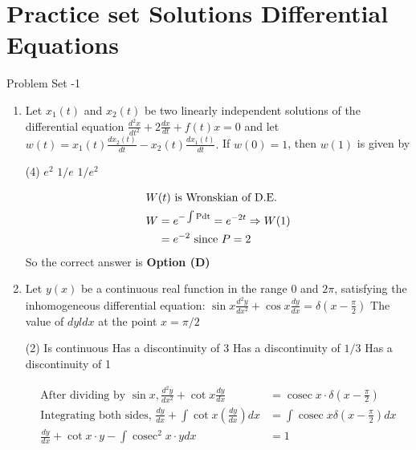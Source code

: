 \chapter{Practice set Solutions Differential Equations}
\begin{abox}
	Problem Set -1
\end{abox}
\begin{enumerate}[label=\color{ocre}\textbf{\arabic*.}]	
	\item Let $x_{1}(t)$ and $x_{2}(t)$ be two linearly independent solutions of the differential equation $\frac{d^{2} x}{d t^{2}}+2 \frac{d x}{d t}+f(t) x=0$ and let $w(t)=x_{1}(t) \frac{d x_{2}(t)}{d t}-x_{2}(t) \frac{d x_{1}(t)}{d t} .$ If $w(0)=1$, then $w(1)$ is given by
	{}
			\begin{tasks}(4)
			\task[\textbf{B.}] $e^{2}$
			\task[\textbf{C.}]  $1 / e$
			\task[\textbf{D.}] $1 / e^{2}$
		\end{tasks}
			\begin{answer}
			\begin{align*}
			\intertext{$W(t)$ is Wronskian of D.E.}
			W&=e^{-\int \mathrm{Pdt}}=e^{-2 t} \Rightarrow W(1)\\&=e^{-2}\text{ since }P=2
			\end{align*}
			So the correct answer is \textbf{Option (D)}
		\end{answer}
\item Let $y(x)$ be a continuous real function in the range 0 and $2 \pi$, satisfying the inhomogeneous differential equation: $\sin x \frac{d^{2} y}{d x^{2}}+\cos x \frac{d y}{d x}=\delta\left(x-\frac{\pi}{2}\right)$ The value of $d y l d x$ at the point $x=\pi / 2$
{}
\begin{tasks}(2)
	\task[\textbf{A.}] Is continuous
	\task[\textbf{B.}] Has a discontinuity of 3
	\task[\textbf{C.}] Has a discontinuity of $1 / 3$
	\task[\textbf{D.}] Has a discontinuity of 1
\end{tasks}
\begin{answer}
	\begin{align*}
	\text{After dividing by }\sin x, \frac{d^{2} y}{d x^{2}}+\cot x \frac{d y}{d x}&=\operatorname{cosec} x \cdot \delta\left(x-\frac{\pi}{2}\right)\\
	\text{Integrating both sides, }\frac{d y}{d x}+\int \cot x\left(\frac{d y}{d x}\right) d x&=\int \operatorname{cosec} x \delta\left(x-\frac{\pi}{2}\right) d x\\
	\frac{d y}{d x}+\cot x \cdot y-\int \operatorname{cosec}^{2} x \cdot y d x&=1\\

\end{align*}
\end{answer}
\end{enumerate}
